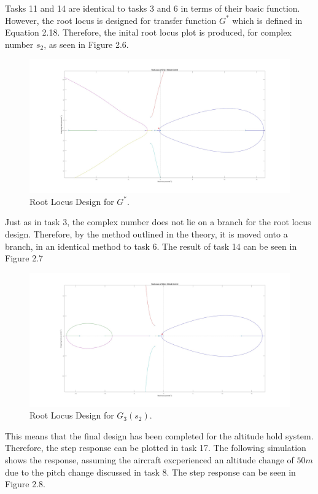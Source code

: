 \documentclass[stu, a4paper, 12pt, floatsintext]{apa7}
\numberwithin{figure}{section}
\numberwithin{table}{section}
\numberwithin{equation}{section}
\begin{document}
Tasks 11 and 14 are identical to tasks 3 and 6 in terms of their basic function. However, the root locus is designed for transfer function $G^*$ which is defined in Equation 2.18. Therefore, the inital root locus plot is produced, for complex number $s_2$, as seen in Figure 2.6. 
\begin{figure}[H]
    \caption{Root Locus Design for $G^*$.}
    \label{fig:task11_result}
    \centering
    \includegraphics[width=1.0\textwidth]{pictures/Auotpilot/Task11.jpg}
\end{figure}
Just as in task 3, the complex number does not lie on a branch for the root locus design. Therefore, by the method outlined in the theory, it is moved onto a branch, in an identical method to task 6. The result of task 14 can be seen in Figure 2.7
\begin{figure}[H]
    \caption{Root Locus Design for $G_3(s_2)$.}
    \label{fig:task14_result}
    \centering
    \includegraphics[width=1.0\textwidth]{pictures/Auotpilot/Task14.jpg}
\end{figure}
This means that the final design has been completed for the altitude hold system. Therefore, the step response can be plotted in task 17. The following simulation shows the response, assuming the aircraft excperienced an altitude change of $50m$ due to the pitch change discussed in task 8. The step response can be seen in Figure 2.8.
\end{document}
